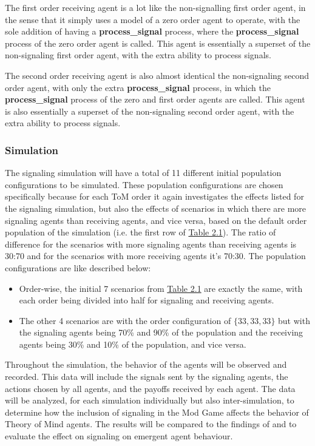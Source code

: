 The first order receiving agent is a lot like the non-signalling first order agent, in the sense that it simply uses a model of a zero order agent to operate, with the sole addition of having a \textbf{process\_signal} process, where the \textbf{process\_signal} process of the zero order agent is called. This agent is essentially a superset of the non-signaling first order agent, with the extra ability to process signals.


The second order receiving agent is also almost identical the non-signaling second order agent, with only the extra \textbf{process\_signal} process, in which the \textbf{process\_signal} process of the zero and first order agents are called. This agent is also essentially a superset of the non-signaling second order agent, with the extra ability to process signals.

\subsubsection{Simulation}

The signaling simulation will have a total of 11 different initial population configurations to be simulated. These population configurations are chosen specifically because for each ToM order it again investigates the effects listed for the signaling simulation, but also the effects of scenarios in which there are more signaling agents than receiving agents, and vice versa, based on the default order population of the simulation (i.e. the first row of \hyperref[tab:reg-population-table]{Table 2.1}). The ratio of difference for the scenarios with more signaling agents than receiving agents is 30:70 and for the scenarios with more receiving agents it's 70:30. The population configurations are like described below:

\begin{itemize}
    \item Order-wise, the initial 7 scenarios from \hyperref[tab:reg-population-table]{Table 2.1} are exactly the same, with each order being divided into half for signaling and receiving agents.
    \item The other 4 scenarios are with the order configuration of $\{33,33,33\}$ but with the signaling agents being 70\% and 90\% of the population and the receiving agents being 30\% and 10\% of the population, and vice versa.
\end{itemize}


Throughout the simulation, the behavior of the agents will be observed and recorded. This data will include the signals sent by the signaling agents, the actions chosen by all agents, and the payoffs received by each agent. The data will be analyzed, for each simulation individually but also inter-simulation, to determine how the inclusion of signaling in the Mod Game affects the behavior of Theory of Mind agents. The results will be compared to the findings of \cite{de2013much} and \cite{veltman2019training} to evaluate the effect on signaling on emergent agent behaviour.